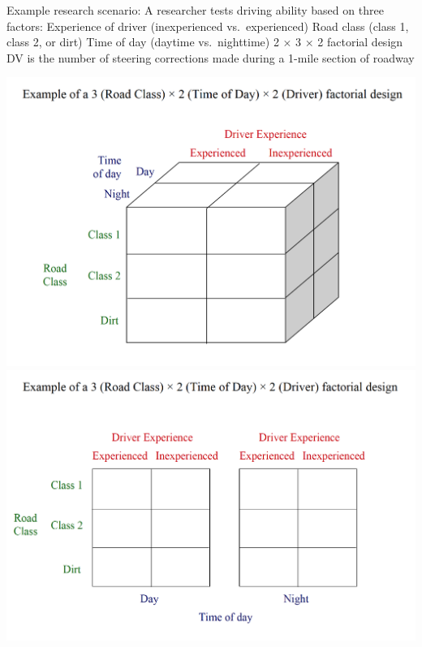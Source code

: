 \documentclass[]{book}
\theoremstyle{definition}
\theoremstyle{definition}
\theoremstyle{definition}
\theoremstyle{remark}
\begin{document}
Example research scenario: A researcher tests driving ability based on
three factors: Experience of driver (inexperienced vs.~experienced) Road
class (class 1, class 2, or dirt) Time of day (daytime vs.~nighttime) 2
× 3 × 2 factorial design DV is the number of steering corrections made
during a 1-mile section of roadway

\includegraphics{img/hicksfa27.png} \includegraphics{img/hicksfa28.png}
\end{document}
